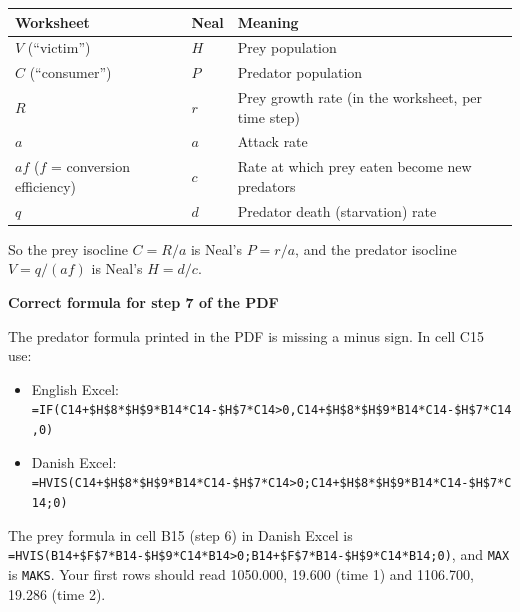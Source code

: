 \documentclass[
  a4paper]{book}
\newcounter{none} %
\providecommand{\tightlist}{%
  \setlength{\itemsep}{0pt}\setlength{\parskip}{0pt}}
\begin{document}
{\def\LTcaptype{none} %
\begin{longtable}[]{@{}
  >{\raggedright\arraybackslash}p{}
  >{\raggedright\arraybackslash}p{}
  >{\raggedright\arraybackslash}p{}@{}}
\toprule\noalign{}
\begin{minipage}[b]{\linewidth}\raggedright
Worksheet
\end{minipage} & \begin{minipage}[b]{\linewidth}\raggedright
Neal
\end{minipage} & \begin{minipage}[b]{\linewidth}\raggedright
Meaning
\end{minipage} \\
\midrule\noalign{}
\endhead
\bottomrule\noalign{}
\endlastfoot
\(V\) (``victim'') & \(H\) & Prey population \\
\(C\) (``consumer'') & \(P\) & Predator population \\
\(R\) & \(r\) & Prey growth rate (in the worksheet, per time step) \\
\(a\) & \(a\) & Attack rate \\
\(af\) (\(f\) = conversion efficiency) & \(c\) & Rate at which prey eaten become new predators \\
\(q\) & \(d\) & Predator death (starvation) rate \\
\end{longtable}
}

So the prey isocline \(C = R/a\) is Neal's \(P = r/a\), and the predator isocline \(V = q/(af)\) is Neal's \(H = d/c\).

\textbf{Correct formula for step 7 of the PDF}

The predator formula printed in the PDF is missing a minus sign. In cell C15 use:

\begin{itemize}
\tightlist
\item
  English Excel: \texttt{=IF(C14+\$H\$8*\$H\$9*B14*C14-\$H\$7*C14\textgreater{}0,C14+\$H\$8*\$H\$9*B14*C14-\$H\$7*C14,0)}
\item
  Danish Excel: \texttt{=HVIS(C14+\$H\$8*\$H\$9*B14*C14-\$H\$7*C14\textgreater{}0;C14+\$H\$8*\$H\$9*B14*C14-\$H\$7*C14;0)}
\end{itemize}

The prey formula in cell B15 (step 6) in Danish Excel is \texttt{=HVIS(B14+\$F\$7*B14-\$H\$9*C14*B14\textgreater{}0;B14+\$F\$7*B14-\$H\$9*C14*B14;0)}, and \texttt{MAX} is \texttt{MAKS}. Your first rows should read 1050.000, 19.600 (time 1) and 1106.700, 19.286 (time 2).
\end{document}
